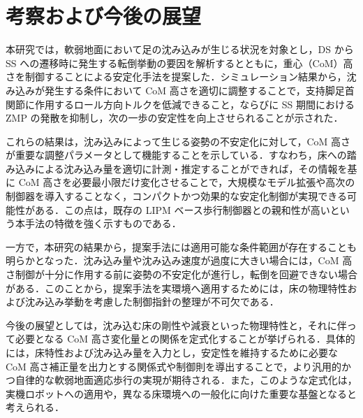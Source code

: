 \section{考察および今後の展望}
\label{sec:discussion_future}

本研究では，軟弱地面において足の沈み込みが生じる状況を対象とし，DS から SS への遷移時に発生する転倒挙動の要因を解析するとともに，重心（CoM）高さを制御することによる安定化手法を提案した．シミュレーション結果から，沈み込みが発生する条件において CoM 高さを適切に調整することで，支持脚足首関節に作用するロール方向トルクを低減できること，ならびに SS 期間における ZMP の発散を抑制し，次の一歩の安定性を向上させられることが示された．

これらの結果は，沈み込みによって生じる姿勢の不安定化に対して，CoM 高さが重要な調整パラメータとして機能することを示している．すなわち，床への踏み込みによる沈み込み量を適切に計測・推定することができれば，その情報を基に CoM 高さを必要最小限だけ変化させることで，大規模なモデル拡張や高次の制御器を導入することなく，コンパクトかつ効果的な安定化制御が実現できる可能性がある．この点は，既存の LIPM ベース歩行制御器との親和性が高いという本手法の特徴を強く示すものである．

一方で，本研究の結果から，提案手法には適用可能な条件範囲が存在することも明らかとなった．沈み込み量や沈み込み速度が過度に大きい場合には，CoM 高さ制御が十分に作用する前に姿勢の不安定化が進行し，転倒を回避できない場合がある．このことから，提案手法を実環境へ適用するためには，床の物理特性および沈み込み挙動を考慮した制御指針の整理が不可欠である．

今後の展望としては，沈み込む床の剛性や減衰といった物理特性と，それに伴って必要となる CoM 高さ変化量との関係を定式化することが挙げられる．具体的には，床特性および沈み込み量を入力とし，安定性を維持するために必要な CoM 高さ補正量を出力とする関係式や制御則を導出することで，より汎用的かつ自律的な軟弱地面適応歩行の実現が期待される．また，このような定式化は，実機ロボットへの適用や，異なる床環境への一般化に向けた重要な基盤となると考えられる．
